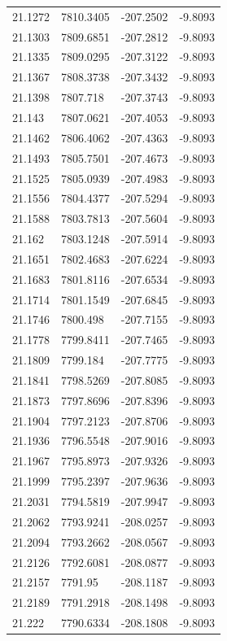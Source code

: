 \begin{table}[H]
\begin{tabular}{llll}
21.1272 & 7810.3405 & -207.2502 & -9.8093 \\
21.1303 & 7809.6851 & -207.2812 & -9.8093 \\
21.1335 & 7809.0295 & -207.3122 & -9.8093 \\
21.1367 & 7808.3738 & -207.3432 & -9.8093 \\
21.1398 & 7807.718 & -207.3743 & -9.8093 \\
21.143 & 7807.0621 & -207.4053 & -9.8093 \\
21.1462 & 7806.4062 & -207.4363 & -9.8093 \\
21.1493 & 7805.7501 & -207.4673 & -9.8093 \\
21.1525 & 7805.0939 & -207.4983 & -9.8093 \\
21.1556 & 7804.4377 & -207.5294 & -9.8093 \\
21.1588 & 7803.7813 & -207.5604 & -9.8093 \\
21.162 & 7803.1248 & -207.5914 & -9.8093 \\
21.1651 & 7802.4683 & -207.6224 & -9.8093 \\
21.1683 & 7801.8116 & -207.6534 & -9.8093 \\
21.1714 & 7801.1549 & -207.6845 & -9.8093 \\
21.1746 & 7800.498 & -207.7155 & -9.8093 \\
21.1778 & 7799.8411 & -207.7465 & -9.8093 \\
21.1809 & 7799.184 & -207.7775 & -9.8093 \\
21.1841 & 7798.5269 & -207.8085 & -9.8093 \\
21.1873 & 7797.8696 & -207.8396 & -9.8093 \\
21.1904 & 7797.2123 & -207.8706 & -9.8093 \\
21.1936 & 7796.5548 & -207.9016 & -9.8093 \\
21.1967 & 7795.8973 & -207.9326 & -9.8093 \\
21.1999 & 7795.2397 & -207.9636 & -9.8093 \\
21.2031 & 7794.5819 & -207.9947 & -9.8093 \\
21.2062 & 7793.9241 & -208.0257 & -9.8093 \\
21.2094 & 7793.2662 & -208.0567 & -9.8093 \\
21.2126 & 7792.6081 & -208.0877 & -9.8093 \\
21.2157 & 7791.95 & -208.1187 & -9.8093 \\
21.2189 & 7791.2918 & -208.1498 & -9.8093 \\
21.222 & 7790.6334 & -208.1808 & -9.8093 \\

\end{tabular}
\end{table}
